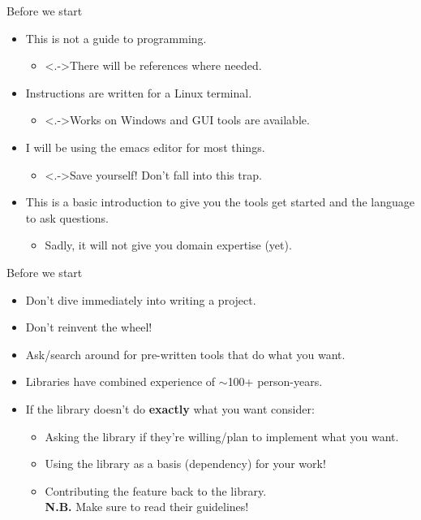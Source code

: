 \documentclass[usenames,dvipsnames]{beamer}
\begin{document}
\begin{frame}{Before we start}
    \begin{itemize}[<+->]
        \item{}This is not a guide to programming. 
        \begin{itemize}
            \item<.->{}There will be references where needed.
        \end{itemize}
        \item{}Instructions are written for a Linux terminal. 
        \begin{itemize}
            \item<.->{}Works on Windows and GUI tools are available.
        \end{itemize}
        \item{}I will be using the emacs editor for most things. 
        \begin{itemize}
            \item<.->{}Save yourself! Don't fall into this trap.
        \end{itemize}
        \item{}This is a basic introduction to give you the tools get started and the language to ask questions. 
        \begin{itemize}
            \item{}Sadly, it will not give you domain expertise (yet).
        \end{itemize}
    \end{itemize}
\end{frame}

\begin{frame}{Before we start}
    \begin{itemize}[<+->]
        \item{}Don't dive immediately into writing a project.
        \item{}Don't reinvent the wheel!
        \item{}Ask/search around for pre-written tools that do what you want.
        \item{}Libraries have combined experience of $\sim{}\!$100+ person-years.
        \item{}If the library doesn't do \textbf{exactly} what you want consider:
        \begin{itemize}
            \item{}Asking the library if they're willing/plan to implement what you want.
            \item{}Using the library as a basis (dependency) for your work!
            \item{}Contributing the feature back to the library. \\ \textbf{N.B.} Make sure to read their guidelines!
        \end{itemize}
    \end{itemize}
\end{frame}
\end{document}
